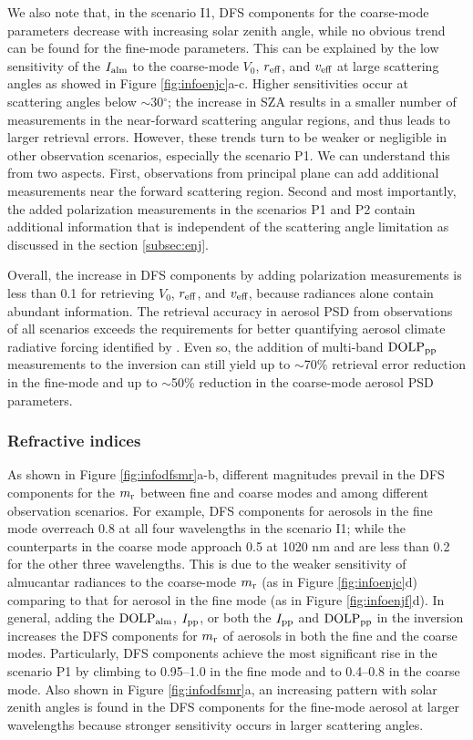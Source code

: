 We also note that, in the scenario I1, DFS components for the coarse-mode
parameters decrease with increasing solar zenith angle, while no obvious trend
can be found for the fine-mode parameters. This can be explained by the low
sensitivity of the $I_\text{alm}$ to the coarse-mode $V_0$, $r_\text{eff}$, and $v_\text{eff}$ at
large scattering angles as showed in Figure \ref{fig:infoenjc}a-c. Higher 
sensitivities occur at scattering angles below $\sim$30$^\circ$; the increase
in SZA results in a smaller number of measurements in the near-forward 
scattering angular regions, and thus leads to larger retrieval errors. 
However, these trends turn to be weaker or negligible in other observation 
scenarios, especially the scenario P1. We can understand this from two aspects.
First, observations from principal plane can add additional measurements near
the forward scattering region. Second and most importantly, the added 
polarization measurements in the scenarios P1 and P2 contain additional 
information that is independent of the scattering angle limitation as 
discussed in the section \ref{subsec:enj}.

Overall, the increase in DFS components by adding polarization measurements is
less than 0.1 for retrieving $V_0$, $r_\text{eff}$, and $v_\text{eff}$, because radiances alone
contain abundant information. The retrieval accuracy in aerosol PSD from
observations of all scenarios exceeds the requirements for better quantifying
aerosol climate radiative forcing identified by \citet{Mishchenko04}. Even
so, the addition of multi-band $\text{DOLP}_\text{pp}$ measurements to the inversion can
still yield up to $\sim$70\% retrieval error reduction in the fine-mode and up
to $\sim$50\% reduction in the coarse-mode aerosol PSD parameters. 

\subsubsection{Refractive indices}

As shown in Figure \ref{fig:infodfsmr}a-b, different magnitudes prevail in
the DFS components for the $m_\text{r}$ between fine and coarse modes and among
different observation scenarios. For example, DFS components for aerosols in
the fine mode overreach 0.8 at all four wavelengths in the scenario I1; while
the counterparts in the coarse mode approach 0.5 at 1020 nm and are less than
0.2 for the other three wavelengths. This is due to the weaker sensitivity of
almucantar radiances to the coarse-mode $m_\text{r}$  (as in Figure
\ref{fig:infoenjc}d) comparing to that for aerosol in the fine
mode (as in Figure \ref{fig:infoenjf}d). In general, adding the $\text{DOLP}_\text{alm}$,
$I_\text{pp}$, or both the $I_\text{pp}$ and $\text{DOLP}_\text{pp}$ in the inversion increases the DFS
components for $m_\text{r}$ of aerosols in both the fine and the coarse modes. 
Particularly, DFS components achieve the most significant rise in the scenario
P1 by climbing to 0.95--1.0 in the fine mode and to 0.4--0.8 in the coarse 
mode. Also shown in Figure \ref{fig:infodfsmr}a, an increasing pattern with
solar zenith angles is found in the DFS components for the fine-mode aerosol
at larger wavelengths because stronger sensitivity occurs in larger scattering
angles.

